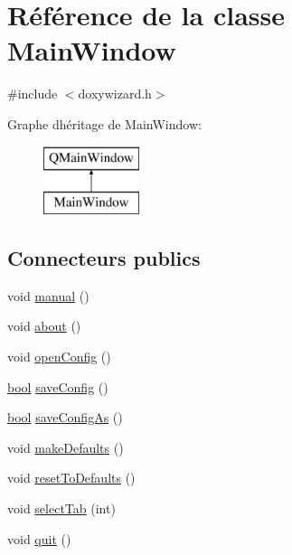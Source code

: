 \hypertarget{class_main_window}{}\section{Référence de la classe Main\+Window}
\label{class_main_window}


{\ttfamily \#include $<$doxywizard.\+h$>$}

Graphe d\textquotesingle{}héritage de Main\+Window\+:\begin{figure}[H]
\begin{center}
\leavevmode
\includegraphics[height=2.000000cm]{class_main_window}
\end{center}
\end{figure}
\subsection*{Connecteurs publics}
\begin{DoxyCompactItemize}
\item 
void \hyperlink{class_main_window_a2670f0411425979516c0a76f0a107c91}{manual} ()
\item 
void \hyperlink{class_main_window_a7be6a5d98970ac1a6296c6f9aee1e9bb}{about} ()
\item 
void \hyperlink{class_main_window_af0d5a43788f46d7bb62c5394cff54190}{open\+Config} ()
\item 
\hyperlink{qglobal_8h_a1062901a7428fdd9c7f180f5e01ea056}{bool} \hyperlink{class_main_window_ab2d0912186a241c25daa1a8e12c3dfdd}{save\+Config} ()
\item 
\hyperlink{qglobal_8h_a1062901a7428fdd9c7f180f5e01ea056}{bool} \hyperlink{class_main_window_a6a294f349550e169b777b202275bf8d5}{save\+Config\+As} ()
\item 
void \hyperlink{class_main_window_a686b4b149395eb4917fb5585262f9d12}{make\+Defaults} ()
\item 
void \hyperlink{class_main_window_a2f1707d863ac6cd5bb9264437d7b9291}{reset\+To\+Defaults} ()
\item 
void \hyperlink{class_main_window_aae188d3d8aa8ac4ce94ad1d1875b6cfb}{select\+Tab} (int)
\item 
void \hyperlink{class_main_window_a542a7527ced73b2c9bc14f8dc9661a66}{quit} ()
\end{DoxyCompactItemize}
